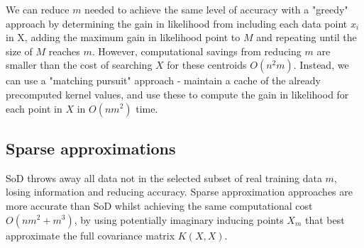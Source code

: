 
We can reduce $m$ needed to achieve the same level of accuracy with a "greedy" approach by determining the gain in likelihood from including each data point $x_i$ in X, adding the maximum gain in likelihood point to $M$ and repeating until the size of $M$ reaches $m$. However, computational savings from reducing $m$ are smaller than the cost of searching $X$ for these centroids $O(n^2m)$. Instead, we can use a "matching pursuit" approach - maintain a cache of the already precomputed kernel values, and use these to compute the gain in likelihood for each point in $X$ in $O(nm^2)$ time. \cite{matching-pursuit}


\subsection{Sparse approximations \cite{big-data}}
SoD throws away all data not in the selected subset of real training data $m$, losing information and reducing accuracy. Sparse approximation approaches are more accurate than SoD whilst achieving the same computational cost $O(nm^2 + m^3)$, by using potentially imaginary inducing points $X_m$ that best approximate the full covariance matrix $K(X,X)$. 


